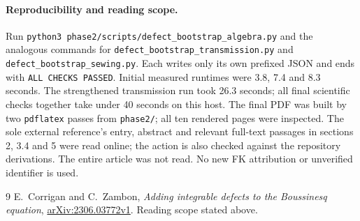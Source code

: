 \documentclass[11pt,a4paper]{article}
\newcommand{\file}[1]{\nolinkurl{#1}}
\begin{document}
\paragraph{Reproducibility and reading scope.}
Run \texttt{python3 }\file{phase2/scripts/defect_bootstrap_algebra.py} and the analogous
commands for \file{defect_bootstrap_transmission.py} and
\file{defect_bootstrap_sewing.py}. Each writes only its own prefixed JSON
and ends with \texttt{ALL CHECKS PASSED}. Initial measured runtimes were
3.8, 7.4 and 8.3 seconds. The strengthened transmission run took 26.3 seconds;
all final scientific checks together take under 40 seconds on this host.
The final PDF was built by two \file{pdflatex} passes from \file{phase2/};
all ten rendered pages were inspected.
The sole external reference's entry, abstract and relevant full-text passages
in sections 2, 3.4 and 5 were read online; the action is also checked
against the repository derivations. The entire article was not read.
No new FK attribution or unverified identifier is used.

\begin{thebibliography}{9}
 E.~Corrigan and C.~Zambon,
\emph{Adding integrable defects to the Boussinesq equation},
\href{https://arxiv.org/html/2306.03772v1}{arXiv:2306.03772v1}.
Reading scope stated above.
\end{thebibliography}
\end{document}
